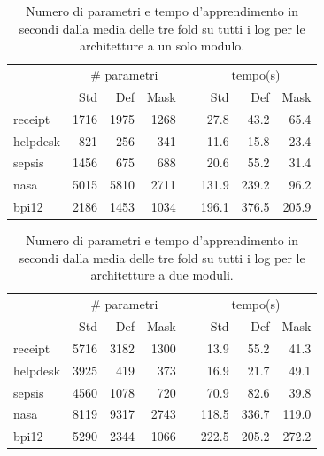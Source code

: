 \documentclass[12pt,a4paper]{report}
\begin{document}
    \begin{table}[t]
    \caption{Numero di parametri e tempo d'apprendimento in secondi 
        dalla media delle tre fold su tutti i log per le architetture
        a un solo modulo.}
    \begin{center}  \label{table:time1}
    \begin{tabular}{lrrrcrrr}
    & \multicolumn{3}{c}{\# parametri} & & \multicolumn{3}{c}{tempo(s)} \\
    & Std & Def & Mask & & Std & Def & Mask \\
    \cline{2-4} \cline{6-8}
    receipt     & 1716 & 1975 & 1268 &  &  27.8 &  43.2 &  65.4 \\ 
    helpdesk    &  821 &  256 &  341 &  &  11.6 &  15.8 &  23.4 \\
    sepsis      & 1456 &  675 &  688 &  &  20.6 &  55.2 &  31.4 \\ 
    nasa        & 5015 & 5810 & 2711 &  & 131.9 & 239.2 &  96.2 \\ 
    bpi12       & 2186 & 1453 & 1034 &  & 196.1 & 376.5 & 205.9 \\ 
    \end{tabular}
    \end{center}
    \end{table}
    
    \begin{table}[t]
    \caption{Numero di parametri e tempo d'apprendimento in secondi 
        dalla media delle tre fold su tutti i log per le architetture
        a due moduli.}
    \begin{center} \label{table:time2}
    \begin{tabular}{lrrrcrrr}
    \hline
    & \multicolumn{3}{c}{\# parametri} & & \multicolumn{3}{c}{tempo(s)} \\
    & Std & Def & Mask & & Std & Def & Mask \\
    \cline{2-4} \cline{6-8}
    receipt     & 5716 & 3182 & 1300 &  &  13.9 &  55.2 &  41.3 \\
    helpdesk    & 3925 &  419 &  373 &  &  16.9 &  21.7 &  49.1 \\
    sepsis      & 4560 & 1078 &  720 &  &  70.9 &  82.6 &  39.8 \\ 
    nasa        & 8119 & 9317 & 2743 &  & 118.5 & 336.7 & 119.0 \\ 
    bpi12       & 5290 & 2344 & 1066 &  & 222.5 & 205.2 & 272.2 \\ 
    \hline
    \end{tabular}
    \end{center}
    \end{table}
    
\end{document}
